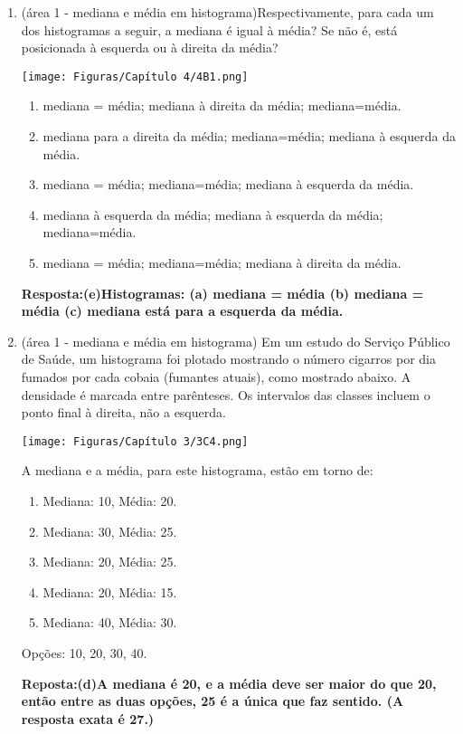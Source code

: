 \documentclass[12pt]{article}\documentclass[brazilian,12pt,a4paper,final]{article}
\begin{document}
\begin{enumerate}
\item (área 1 - mediana e média em histograma)Respectivamente, para cada um dos  histogramas a seguir, a mediana é igual à média? Se não é, está posicionada à esquerda ou à direita da média?

\texttt{[image: Figuras/Capítulo 4/4B1.png]}

\begin{enumerate}
    \item mediana = média; mediana à direita da média; mediana=média.
    \item mediana para a direita da média; mediana=média; mediana à  esquerda da média.
    \item mediana = média; mediana=média; mediana à esquerda da média.
    \item mediana à esquerda da média; mediana à esquerda da média; mediana=média.
    \item mediana = média; mediana=média; mediana à direita da média.
\end{enumerate}

\textbf{Resposta:(e)Histogramas: (a) mediana = média (b) mediana = média
(c) mediana está para a esquerda da média.}

\item (área 1 - mediana e média em histograma) Em um estudo do Serviço Público de Saúde, um histograma foi plotado mostrando o número
cigarros por dia fumados por cada cobaia (fumantes atuais), como mostrado
abaixo. A densidade é marcada entre parênteses. Os intervalos das classes incluem o ponto final à direita, não a esquerda.

 \texttt{[image: Figuras/Capítulo 3/3C4.png]}
 
A mediana e a média, para este histograma, estão em torno de:
\begin{enumerate}
    \item Mediana: 10, Média: 20.
    \item Mediana: 30, Média: 25.
    \item Mediana: 20, Média: 25.
    \item Mediana: 20, Média: 15.
    \item Mediana: 40, Média: 30.
\end{enumerate}Opções: 10, 20, 30, 40.

\textbf{Reposta:(d)A mediana é 20, e a média deve ser maior do que 20, então entre as duas opções, 25 é a única que faz  sentido. (A resposta exata é 27.)}


\end{enumerate}
\end{document}
